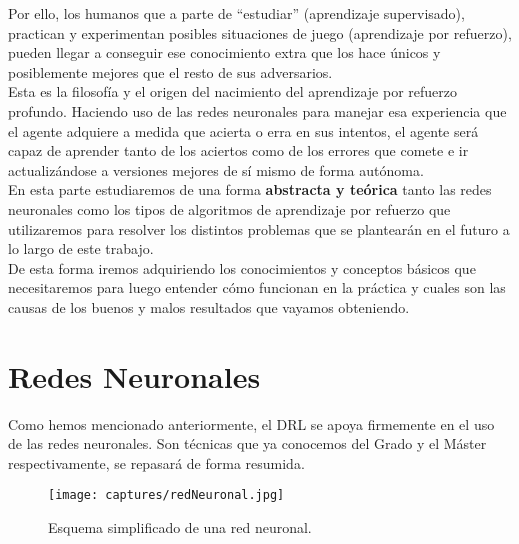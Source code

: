 \documentclass[11pt,fleqn]{book} %
\begin{document}
Por ello, los humanos que a parte de ``estudiar'' (aprendizaje supervisado), practican y experimentan posibles situaciones de juego (aprendizaje por refuerzo), pueden llegar a conseguir ese conocimiento extra que los hace únicos y posiblemente mejores que el resto de sus adversarios. \\

Esta es la filosofía y el origen del nacimiento del aprendizaje por refuerzo profundo. Haciendo uso de las redes neuronales para manejar esa experiencia que el agente adquiere a medida que acierta o erra en sus intentos, el agente será capaz de aprender tanto de los aciertos como de los errores que comete e ir actualizándose a versiones mejores de sí mismo de forma autónoma. \\

En esta parte estudiaremos de una forma \textbf{abstracta y teórica} tanto las redes neuronales como los tipos de algoritmos de aprendizaje por refuerzo que utilizaremos para resolver los distintos problemas que se plantearán en el futuro a lo largo de este trabajo. \\

De esta forma iremos adquiriendo los conocimientos y conceptos básicos que necesitaremos para luego entender cómo funcionan en la práctica y cuales son las causas de los buenos y malos resultados que vayamos obteniendo.

\chapter{Redes Neuronales}\label{sec:deeplearning}

Como hemos mencionado anteriormente, el DRL se apoya firmemente en el uso de las redes neuronales. Son técnicas que ya conocemos del Grado y el Máster respectivamente, se repasará de forma resumida. \cite{article:redesNeuronalesMicrosoft} \cite{book:TFGredes} \cite{article:redesNeuronales} \cite{article:RLromero} \\

\begin{figure}[H]
	\centering\texttt{[image: captures/redNeuronal.jpg]}
	\caption{Esquema simplificado de una red neuronal. \cite{article:redNeuronal}}
	\label{fig:redNeuronal} %
\end{figure}
\end{document}

